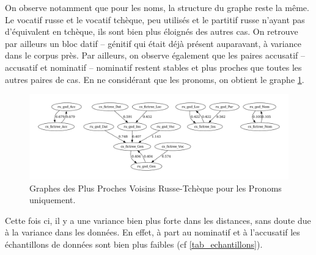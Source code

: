 \documentclass{cours}
\begin{document}
On observe notamment que pour les noms, la structure du graphe reste la même.
Le vocatif russe et le vocatif tchèque, peu utilisés et le partitif russe n'ayant pas d'équivalent en tchèque, ils sont bien plus éloignés des autres cas.
On retrouve par ailleurs un bloc datif -- génitif qui était déjà présent auparavant, à variance dans le corpus près.
Par ailleurs, on observe également que les paires accusatif -- accusatif et nominatif -- nominatif restent stables et plus proches que toutes les autres paires de cas.
En ne considérant que les pronoms, on obtient le graphe \ref{fig_gnn_pronouns_ru_cz}.


\begin{figure}
	\centering
	\includegraphics[width=\textwidth]{Figures/GNN/gnn_ru_gsd_cs_fictree_Pronouns_Only}
	\caption{Graphes des Plus Proches Voisins Russe-Tchèque pour les Pronoms uniquement.}
	\label{fig_gnn_pronouns_ru_cz}
\end{figure}

Cette fois ci, il y a une variance bien plus forte dans les distances, sans doute due à la variance dans les données. En effet, à part au nominatif et à l'accusatif les échantillons de données sont bien plus faibles (cf \ref{tab_echantillons}).
\end{document}
